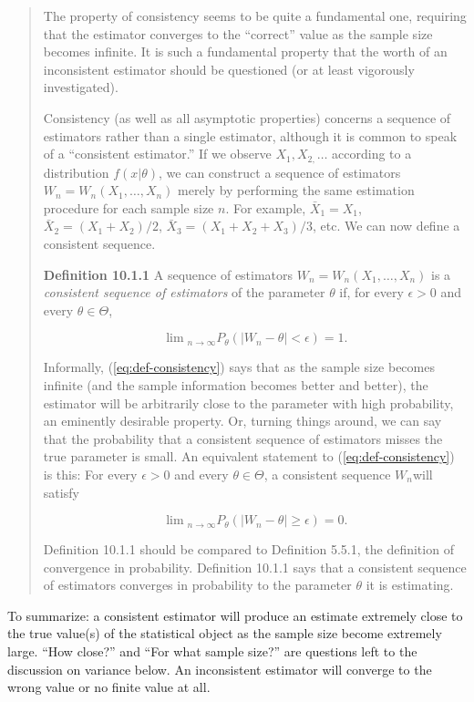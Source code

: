 \documentclass[english]{article}
\begin{document}
\begin{quote}
The property of consistency seems to be quite a fundamental one, requiring
that the estimator converges to the ``correct'' value as the sample
size becomes infinite. It is such a fundamental property that the
worth of an inconsistent estimator should be questioned (or at least
vigorously investigated).

Consistency (as well as all asymptotic properties) concerns a sequence
of estimators rather than a single estimator, although it is common
to speak of a ``consistent estimator.'' If we observe $X_{1},X_{2,}\ldots$
according to a distribution $f(x|\theta)$, we can construct a sequence
of estimators $W_{n}=W_{n}(X_{1},\ldots,X_{n})$ merely by performing
the same estimation procedure for each sample size $n$. For example,
$\bar{X}_{1}=X_{1}$, $\bar{X}_{2}=(X_{1}+X_{2})/2$, $\bar{X}_{3}=(X_{1}+X_{2}+X_{3})/3$,
etc. We can now define a consistent sequence.

\textbf{Definition 10.1.1} A sequence of estimators $W_{n}=W_{n}(X_{1},\ldots,X_{n})$
is a \textit{consistent sequence of estimators} of the parameter $\theta$
if, for every $\epsilon>0$ and every $\theta\in\Theta$,

\begin{equation}
\lim\!_{n\rightarrow\infty}P_{\theta}(|W_{n}-\theta|<\epsilon)=1.\label{eq:def-consistency}
\end{equation}

Informally, (\ref{eq:def-consistency}) says that as the sample size
becomes infinite (and the sample information becomes better and better),
the estimator will be arbitrarily close to the parameter with high
probability, an eminently desirable property. Or, turning things around,
we can say that the probability that a consistent sequence of estimators
misses the true parameter is small. An equivalent statement to (\ref{eq:def-consistency})
is this: For every $\epsilon>0$ and every $\theta\in\Theta$, a consistent
sequence $W_{n}$will satisfy

\[
\lim\!_{n\rightarrow\infty}P_{\theta}(|W_{n}-\theta|\geq\epsilon)=0.
\]

Definition 10.1.1 should be compared to Definition 5.5.1, the definition
of convergence in probability. Definition 10.1.1 says that a consistent
sequence of estimators converges in probability to the parameter $\theta$
it is estimating.
\end{quote}
To summarize: a consistent estimator will produce an estimate extremely
close to the true value(s) of the statistical object as the sample
size become extremely large. ``How close?'' and ``For what sample
size?'' are questions left to the discussion on variance below. An
inconsistent estimator will converge to the wrong value or no finite
value at all.
\end{document}
